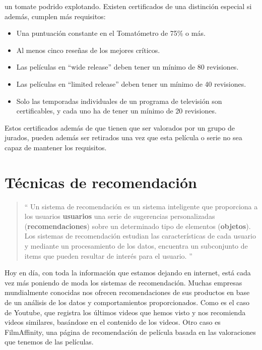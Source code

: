 \begin{itemize}
     un tomate podrido explotando.
    Existen certificados de una distinción especial si además, cumplen más
     requisitos:
     \begin{itemize}
         \item Una puntuación constante en el Tomatómetro de 75\% o más.
         \item Al menos cinco reseñas de los mejores críticos.
         \item Las películas en ``wide release'' deben tener un mínimo de 80 revisiones.
         \item Las películas en ``limited release'' deben tener un mínimo de 40 revisiones.
         \item Solo las temporadas individuales de un programa de televisión son certificables, y cada uno ha de tener un mínimo de 20 revisiones.
     \end{itemize}
    Estos certificados además de que tienen que ser valorados por un grupo de jurados, pueden además ser retirados una vez que esta película o serie
    no sea capaz de mantener los requisitos.
\end{itemize}

\section{Técnicas de recomendación}
\label{makereference2.3}

\begin{quote}
``
Un sistema de recomendación es un sistema inteligente que proporciona a los usuarios \textbf{usuarios} una serie de 
sugerencias personalizadas (\textbf{recomendaciones}) sobre un determinado tipo de elementos (\textbf{objetos}). Los 
sistemas de recomendación estudian las características de cada usuario y mediante un procesamiento 
de los datos, encuentra un subconjunto de items que pueden resultar de interés para el usuario. 
''
\end{quote}

Hoy en día, con toda la información que estamos dejando en internet, está cada vez más poniendo de moda los sistemas de recomendación.
Muchas empresas mundialmente conocidas nos ofrecen recomendaciones de sus productos en base de un análisis de los datos y comportamientos proporcionados.
Como es el caso de Youtube, que registra los últimos videos que hemos visto y nos recomienda videos similares, basándose en el contenido de los videos. Otro caso es FilmAffinity, 
una página de recomendación de película basada en las valoraciones que tenemos de las películas.

